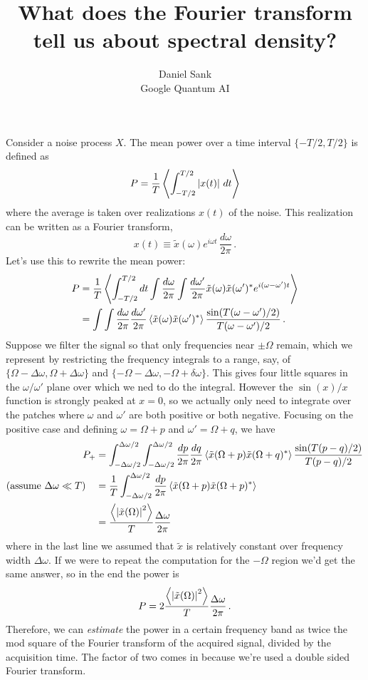 \documentclass{article}
\title{What does the Fourier transform tell us about spectral density?}
\author{Daniel Sank \\ \small{Google Quantum AI}}
\begin{document}
\maketitle

Consider a noise process $X$.
The mean power over a time interval $\{-T/2,T/2\}$ is defined as
\begin{equation}
P = \frac{1}{T} \left \langle \int_{-T/2}^{T/2} \left \lvert x(t) \right \rvert \, dt \right \rangle
\end{equation}
where the average is taken over realizations $x(t)$ of the noise.
This realization can be written as a Fourier transform,
\begin{equation}
x(t) \equiv
\tilde{x}(\omega) e^{i \omega t} \, \frac{d \omega}{2\pi} \, .
\end{equation}
Let's use this to rewrite the mean power:
\begin{align}
P
&= \frac{1}{T}\left \langle 
\int_{-T/2}^{T/2} dt
\int \frac{d\omega}{2\pi}
\int \frac{d\omega'}{2\pi}
\tilde{x}(\omega) \tilde{x}(\omega')^*
e^{i(\omega - \omega')t} \right \rangle \nonumber \\
&= \int \int \frac{d\omega}{2\pi} \frac{d\omega'}{2\pi}
\left \langle \tilde{x}(\omega)\tilde{x}(\omega')^* \right \rangle
\frac{\sin(T(\omega - \omega')/2)}{T (\omega - \omega')/2} \, .
\end{align}
Suppose we filter the signal so that only frequencies near $\pm \Omega$ remain, which we represent by restricting the frequency integrals to a range, say, of $\{\Omega-\Delta \omega, \Omega+\Delta \omega\}$ and $\{-\Omega - \Delta \omega, -\Omega + \delta \omega\}$.
This gives four little squares in the $\omega/\omega'$ plane over which we ned to do the integral.
However the $\sin(x)/x$ function is strongly peaked at $x=0$, so we actually only need to integrate over the patches where $\omega$ and $\omega'$ are both positive or both negative.
Focusing on the positive case and defining $\omega = \Omega + p$ and $\omega' = \Omega + q$, we have
\begin{align}
P_+ &=
\int_{-\Delta \omega/2}^{\Delta\omega/2}
\int_{-\Delta \omega/2}^{\Delta\omega/2}
\frac{dp}{2\pi} \frac{dq}{2\pi}
\left \langle \tilde{x}(\Omega+p)\tilde{x}(\Omega+q)^* \right \rangle \frac{\sin(T(p-q)/2)}{T(p-q)/2} \nonumber \\
(\text{assume }\Delta \omega \ll T) \quad &=
\frac{1}{T} \int_{-\Delta \omega/2}^{\Delta \omega / 2}
\frac{dp}{2\pi} \left \langle \tilde{x}(\Omega + p) \tilde{x}(\Omega + p)^* \right \rangle \nonumber \\
&= \frac{\left \langle \left \lvert \tilde{x}(\Omega) \right \rvert^2 \right \rangle}{T} \frac{\Delta \omega}{2 \pi}
\end{align}
where in the last line we assumed that $\tilde{x}$ is relatively constant over frequency width $\Delta \omega$.
If we were to repeat the computation for the $-\Omega$ region we'd get the same answer, so in the end the power is
\begin{equation}
P = 2 \frac{\left \langle \left \lvert \tilde{x}(\Omega) \right \rvert^2 \right \rangle}{T} \frac{\Delta \omega}{2\pi} \, .
\end{equation}
Therefore, we can \emph{estimate} the power in a certain frequency band as twice the mod square of the Fourier transform of the acquired signal, divided by the acquisition time.
The factor of two comes in because we're used a double sided Fourier transform.
\end{document}
